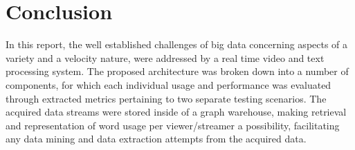 \documentclass[10pt,conference]{IEEEtran}
\begin{document}
\section{Conclusion}
In this report, the well established challenges of big data concerning aspects of a variety and a velocity nature, were addressed by a real time video and text processing system. The proposed architecture was broken down into a number of components, for which each individual usage and performance was evaluated through extracted metrics pertaining to two separate testing scenarios. The acquired data streams were stored inside of a graph warehouse, making retrieval and representation of word usage per viewer/streamer a possibility, facilitating any data mining and data extraction attempts from the acquired data.

  

\end{document}
